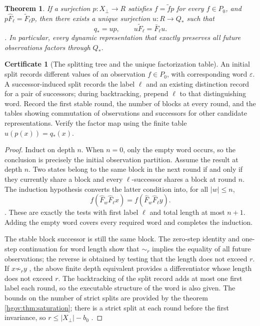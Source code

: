 \documentclass[12pt,a4paper,openany,notitlepage]{report}
\theoremstyle{plain}
\newtheorem{theorem}{Theorem}[chapter]
\theoremstyle{definition}
\newtheorem*{certificate}{Certificate}
\theoremstyle{remark}
\def\mathcal#1{#1}\def\mathsf#1{#1}\def\mathbb#1{#1}%
\begin{document}
\begin{CJK*}
\begin{theorem}
If a surjection $p:X_\bot\to R$ satisfies
$f=\widetilde f p$ for every $f\in\mathcal P_0$, and
$p\widehat F_\ell=\widetilde F_\ell p$,
then there exists a unique surjection
$u:R\to Q_*$ such that
\[
 q_*=up,\qquad
 u\widetilde F_\ell=\bar F_\ell u.
\].
In particular, every dynamic representation that exactly preserves all future observations factors through $Q_*$.
\end{theorem}
\begin{certificate} [The splitting tree and the unique factorization table]
An initial split records different values of an observation $f\in\mathcal P_0$, with corresponding word $\varepsilon$. A successor-induced split records the label $\ell$ and an existing distinction record for a pair of successors; during backtracking, prepend $\ell$ to that distinguishing word. Record the first stable round, the number of blocks at every round, and the tables showing commutation of observations and successors for other candidate representations. Verify the factor map using the finite table $u(p(x))=q_*(x)$.
\end{certificate}
\begin{proof}
Induct on depth $n$. When $n=0$, only the empty word occurs, so the conclusion is precisely the initial observation partition. Assume the result at depth $n$. Two states belong to the same block in the next round if and only if they currently share a block and every $\ell$-successor shares a block at round $n$. The induction hypothesis converts the latter condition into, for all $|w|\le n$,
\[
 f(\widehat F_w\widehat F_\ell x)
 =f(\widehat F_w\widehat F_\ell y).
\].
These are exactly the tests with first label $\ell$ and total length at most $n+1$. Adding the empty word covers every required word and completes the induction.

The stable block successor is still the same block. The zero-step identity and one-step continuation for word length show that $\sim_r$ implies the equality of all future observations; the reverse is obtained by testing that the length does not exceed $r$. If $x\not\sim_ry$ , the above finite depth equivalent provides a differentiator whose length does not exceed $r$. The backtracking of the split record adds at most one first label each round, so the executable structure of the word is also given. The bounds on the number of strict splits are provided by the theorem ~ \ref{hgov:thm:saturation}; there is a strict split at each round before the first invariance, so $r\le |X_\bot|-b_0$ .


\end{proof}
\end{CJK*}
\end{document}
